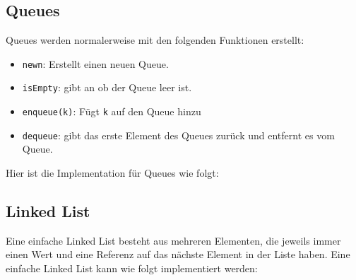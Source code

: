 \documentclass[ngerman,
color=3b,
load_common, %
boxarc,
main,
tikz,
border=3mm
]{article}
\begin{document}
\newpage
\subsection{Queues}
Queues werden normalerweise mit den folgenden Funktionen erstellt:
\begin{itemize}
    \item \texttt{new{n}}: Erstellt einen neuen Queue.
    \item \texttt{isEmpty}: gibt an ob der Queue leer ist.
    \item \texttt{enqueue(k)}: Fügt \texttt{k} auf den Queue hinzu
    \item \texttt{dequeue}: gibt das erste Element des Queues zurück und entfernt es vom Queue.
\end{itemize}
Hier ist die Implementation für Queues wie folgt:


\newpage
\subsection{Linked List}
Eine einfache Linked List besteht aus mehreren Elementen, die jeweils immer einen Wert und eine Referenz auf das nächste Element in der Liste haben. Eine einfache Linked List kann wie folgt implementiert werden:



\end{document}
